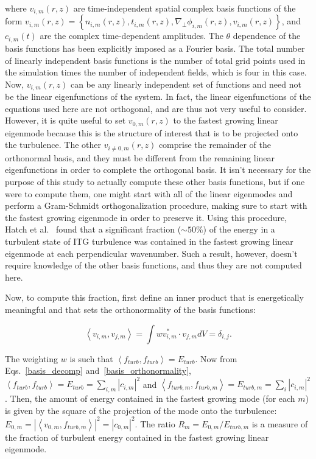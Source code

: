 \documentclass[showpacs,preprintnumbers,amsmath,amssymb,superscriptaddress,aip]{revtex4-1}
\def\beq{\begin{equation}}
\def\eeq{\end{equation}}
\def\grad{\nabla}
\newcommand{\gradperp}{\grad_\perp}
\begin{document}
where $v_{i,m}(r,z)$ are time-independent spatial complex basis functions of the form $v_{i,m}(r,z) = \left\{ n_{i,m}(r,z),t_{i,m}(r,z),\gradperp \phi_{i,m}(r,z), v_{i,m}(r,z) \right\}$,
and $c_{i,m}(t)$ are the complex time-dependent amplitudes. The $\theta$ dependence of the basis functions has been explicitly imposed as a Fourier basis. The total number of
linearly independent basis functions is the number of total grid points used in the simulation times the number of independent fields, which is four in this case.
Now, $v_{i,m}(r,z)$ can be any linearly independent set of functions and need not be the linear eigenfunctions
of the system. In fact, the linear eigenfunctions of the equations used here are not orthogonal, and are thus not very useful to consider. However, it is quite useful to set $v_{0,m}(r,z)$ to the fastest
growing linear eigenmode because this is the structure of interest that is to be projected onto the turbulence. 
The other $v_{i \ne 0,m}(r,z)$ comprise the remainder of the orthonormal basis, and they must be different from
the remaining linear eigenfunctions in order to complete the orthogonal basis. It isn't necessary for the purpose of this study to actually compute these other basis functions, but if one were to compute
them, one might start with all of the linear eigenmodes
and perform a Gram-Schmidt orthogonalization procedure, making sure to start with the fastest growing eigenmode in order to preserve it. Using this procedure, Hatch et al.~\cite{hatch2011}
found that a significant fraction ($\sim 50\%$) of the energy in a turbulent state of ITG turbulence was contained in the fastest growing linear eigenmode at each perpendicular wavenumber.
Such a result, however, doesn't require knowledge of the other basis functions, and thus they are not computed here.

Now, to compute this fraction, first define an inner product that is energetically meaningful and that sets the orthonormality of the basis functions:

\beq
\label{basis_orthonormality}
\left< v_{i,m},v_{j,m} \right> = \int w v_{i,m}^* \cdot v_{j,m} dV = \delta_{i,j}.
\eeq

The weighting $w$ is such that $\left< f_{turb}, f_{turb} \right> = E_{turb}$.
Now from Eqs.~\ref{basis_decomp} and~\ref{basis_orthonormality}, $\left< f_{turb}, f_{turb} \right> = E_{turb} = \sum_{i,m} |c_{i,m}|^2$ and 
$\left< f_{turb,m}, f_{turb,m} \right> = E_{turb,m} = \sum_i |c_{i,m}|^2$.
Then, the amount of energy contained in the fastest growing mode (for each $m$) is given by the square of the projection
of the mode onto the turbulence: $E_{0,m} = \left| \left< v_{0,m}, f_{turb,m} \right> \right|^2 = |c_{0,m}|^2$. The ratio 
$R_m = E_{0,m}/E_{turb,m}$ is a measure of the fraction of turbulent energy contained in the fastest growing linear eigenmode. 
\end{document}
